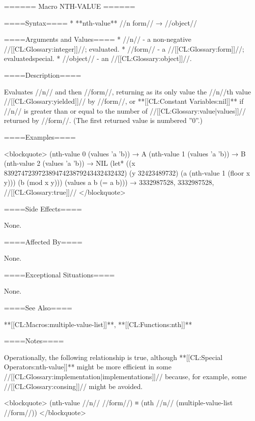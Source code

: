 ====== Macro NTH-VALUE ======

====Syntax====
  * **nth-value** //n form// → //object//

====Arguments and Values====
  * //n// - a non-negative //[[CL:Glossary:integer]]//; evaluated.
  * //form// - a //[[CL:Glossary:form]]//; evaluatedspecial.
  * //object// - an //[[CL:Glossary:object]]//.

====Description====

Evaluates //n// and then //form//, returning as its only value the //n//th value //[[CL:Glossary:yielded]]// by //form//, or **[[CL:Constant Variables:nil]]** if //n// is greater than or equal to the number of //[[CL:Glossary:value|values]]// returned by //form//. (The first returned value is numbered ''0''.)

====Examples====

<blockquote> (nth-value 0 (values 'a 'b)) → A (nth-value 1 (values 'a 'b)) → B (nth-value 2 (values 'a 'b)) → NIL (let* ((x 83927472397238947423879243432432432) (y 32423489732) (a (nth-value 1 (floor x y))) (b (mod x y))) (values a b (= a b))) → 3332987528, 3332987528, //[[CL:Glossary:true]]// </blockquote>

====Side Effects====

None.

====Affected By====

None.

====Exceptional Situations====

None.

====See Also====

**[[CL:Macros:multiple-value-list]]**, **[[CL:Functions:nth]]**

====Notes====

Operationally, the following relationship is true, although **[[CL:Special Operators:nth-value]]** might be more efficient in some //[[CL:Glossary:implementation|implementations]]// because, for example, some //[[CL:Glossary:consing]]// might be avoided.

<blockquote> (nth-value //n// //form//) ≡ (nth //n// (multiple-value-list //form//)) </blockquote>

